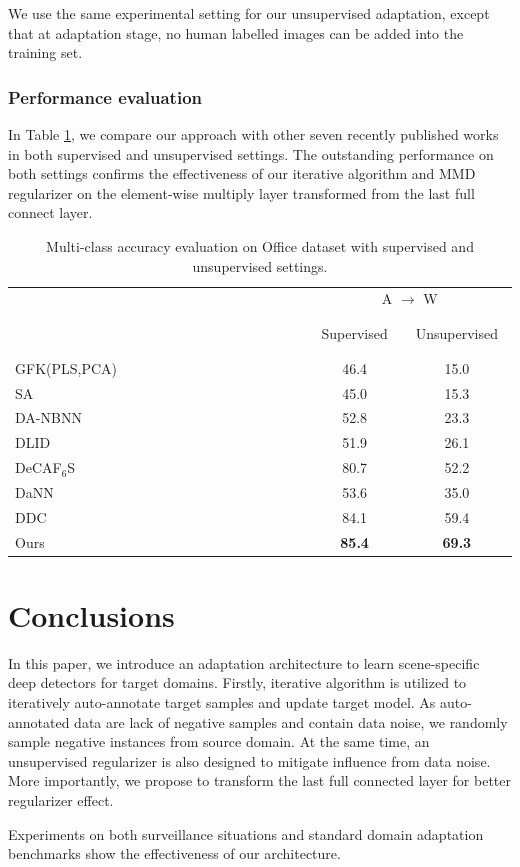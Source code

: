 \documentclass[runningheads]{llncs}
\begin{document}
We use the same experimental setting for our unsupervised adaptation, except that at adaptation stage, no human labelled images can be added into the training set.
\subsubsection{Performance evaluation}
In Table \ref{table:office}, we compare our approach with other seven recently published works in both supervised and unsupervised settings. The outstanding performance on both settings confirms the effectiveness of our iterative algorithm and MMD regularizer on the element-wise multiply layer transformed from the last full connect layer.


\begin{table}
\centering
\caption{Multi-class accuracy evaluation on Office dataset with supervised and unsupervised settings.} \label{table:office}
\begin{tabular}{l c c}
  \hline
   & \multicolumn{2}{c}{A $\rightarrow$ W}    \\
   \cline{2-3}
   ~~~~~~~~~~~~~~~~~~~~~~~~~~~~~~~
   ~~~~~~~~~~~~~~~~~~~~~~~~~~~~~~~
    & ~Supervised~ & ~Unsupervised~ \\
  \hline
  GFK(PLS,PCA)\cite{gong2012geodesic} & 46.4 & 15.0 \\
  SA \cite{fernando2013unsupervised} & 45.0 & 15.3 \\
  DA-NBNN \cite{tommasi2013frustratingly} & 52.8 & 23.3 \\
  DLID \cite{chopra2013dlid}& 51.9 & 26.1 \\
  DeCAF${}_{6}$S \cite{donahue2013decaf} & 80.7 & 52.2 \\
  DaNN \cite{ghifary2014domain}& 53.6 & 35.0 \\
  DDC\cite{tzeng2014deep} & 84.1 & 59.4 \\
  \hline
  Ours & {\bf 85.4} & {\bf 69.3} \\
  \hline
\end{tabular}
\end{table}


\section{Conclusions}
\label{section:Conclusions}

In this paper, we introduce an adaptation architecture to learn scene-specific deep detectors for target domains. Firstly, iterative algorithm is utilized to iteratively auto-annotate target samples and update target model. As auto-annotated data are lack of negative samples and contain data noise, we randomly sample negative instances from source domain. At the same time, an unsupervised regularizer is also designed to mitigate influence from data noise. More importantly, we propose to transform the last full connected layer for better regularizer effect.

Experiments on both surveillance situations and standard domain adaptation benchmarks show the effectiveness of our architecture.




\end{document}
